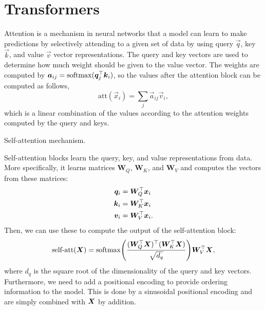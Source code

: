 \newpage

\section{Transformers} \label{sec:transformers}

Attention is a mechanism in neural networks that a model can learn to make
predictions by selectively attending to a given set of data by using query
$\vec{q}$, key $\vec{k}$, and value $\vec{v}$ vector representations. The query
and key vectors are used to determine how much weight should be given to the
value vector. The weights are computed by
$\bm{a}_{ij}=\mathrm{softmax}(\bm{q}_j^\top\bm{k}_i)$, so the values after the
attention block can be computed as follows, \[
    \text{att}(\vec{x}_i) = \sum_{j} \vec{a}_{ij} \vec{v}_i
    ,\]
which is a linear combination of the values according to the attention weights
computed by the query and keys.

\begin{marginfigure}
    \centering
    \caption{Self-attention mechanism.}
    \label{fig:attention}
\end{marginfigure}

Self-attention blocks learn the query, key, and value representations from
data. More specifically, it learns matrices $\bm{W}_Q$, $\bm{W}_K$, and
$\bm{W}_V$ and computes the vectors from these matrices:
\begin{align*}
    \bm{q}_i & = \bm{W}_Q^\top \bm{x}_i \\
    \bm{k}_i & = \bm{W}_K^\top \bm{x}_i \\
    \bm{v}_i & = \bm{W}_V^\top \bm{x}_i
    .\end{align*}
Then, we can use these to compute the output of the self-attention block: \[
    \text{self-att}(\mat{X}) = \softmax \lft(
    \frac{\transpose{(\transpose{\mat{W}_Q}
            \mat{X})}(\transpose{\mat{W}_K}\mat{X})}{\sqrt{d_q}} \rgt)
    \transpose{\mat{W}_V}\mat{X}
    ,\]
where $d_q$ is the square root of the dimensionality of the query and key
vectors. Furthermore, we need to add a positional encoding to provide ordering
information to the model. This is done by a sinusoidal positional encoding and are simply
combined with $\bm{X}$ by addition.

